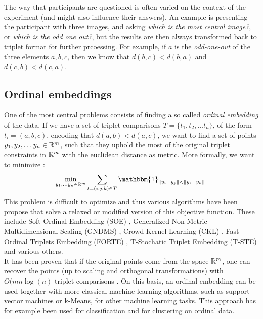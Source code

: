 The way that participants are questioned is often varied on the context of the experiment (and might also influence their answers). An
example is presenting the participant with three images, and asking \textit{which is the most central image?}, or \textit{which is the odd one out?},
but the results are then always transformed back to triplet format for further prcoessing. For example, if $a$ is the \textit{odd-one-out} of the three elements $a,b,c$, 
then we know that $d(b,c) < d(b,a)$ and $d(c, b) < d(c,a)$. 

\subsection{Ordinal embeddings}
One of the most central problems consists of finding a so called \textit{ordinal embedding} of the data. If we have a set of triplet comparisons $T = \{t_1, t_2, \ldots t_n\}$, 
of the form $t_i = \left( a,b,c \right)$, encoding that $d(a,b) < d(a,c)$, 
we want to find a set of points $y_1, y_2, \ldots y_n \in \mathbb{R}^{m}$, such that they uphold the most of the original triplet constraints in $\mathbb{R}^{m}$ with the euclidean distance
as metric. More formally, we want to minimize \cite{vankadaraInsightsOrdinalEmbedding2021}:
\[
    \min_{y_1, \ldots y_n \in \R^{m}} \sum_{t=\left( i,j,k \right)  \in T} \mathbbm{1}_{ \|y_i - y_j\| < \|y_i - y_k\| }
.\] 
This problem is difficult to optimize and thus various algorithms have been propose that solve a relaxed or modified version of this objective function. 
These include Soft Ordinal Embedding (SOE) \cite{teradaLocalOrdinalEmbedding2014}, Generalized Non-Metric Multidimensional Scaling (GNDMS) \cite{agarwalGeneralizedNonmetricMultidimensional2007}, 
Crowd Kernel Learning (CKL) \cite{tamuzAdaptivelyLearningCrowd2011}, Fast Ordinal Triplets Embedding (FORTE) \cite{jainFiniteSamplePrediction2016},
T-Stochatic Triplet Embedding (T-STE) \cite{laurensvandermaatenStochasticTripletEmbedding2012} and various others. \\

It has been proven that if the original points come from the space $\mathbb{R}^{m}$, one can recover the points (up to scaling and orthogonal transformations) with $O(mn\log(n)$ triplet comparisons
\cite{jainFiniteSamplePrediction2016}. On this basis, an ordinal embedding can be used together with more classical machine learning algorithms, such as support vector machines or k-Means,
for other machine learning tasks. This approach has for example been used for classification \cite{tamuzAdaptivelyLearningCrowd2011, kleindessnerLensDepthFunction2017} and for clustering \cite{kleindessnerLensDepthFunction2017} on ordinal data. \\

